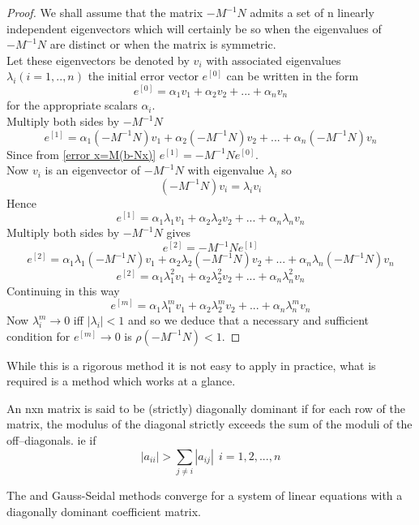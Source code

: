 \begin{proof}
We shall assume that the matrix $-M^{-1}N$ admits a set of n linearly independent
eigenvectors which will certainly be so when the eigenvalues of $-M^{-1}N$ are 
distinct or when the matrix is symmetric.\\
Let these eigenvectors be denoted by $v_i$ with associated eigenvalues $\lambda_i (i=1,..,n)$ the initial error vector $e^{[0]}$ can be written in the form
\[ e^{[0]} = \alpha_1 v_1+\alpha_2v_2+...+\alpha_nv_n\]
for the appropriate scalars $\alpha_i$.\\
Multiply both sides by $-M^{-1}N$
\[ e^{[1]} = \alpha_1 (-M^{-1}N)v_1+\alpha_2(-M^{-1}N)v_2+...+\alpha_n(-M^{-1}N)v_n\]
Since from
\ref{error x=M(b-Nx)} $e^{[1]} = -M^{-1}Ne^{[0]}$.\\
Now $v_i$ is an eigenvector of $-M^{-1}N$ with eigenvalue $\lambda_i$ so
\[
(-M^{-1}N)v_{i}=\lambda_iv_i
\]
Hence
\[ e^{[1]} = \alpha_1 \lambda_1 v_1+\alpha_2\lambda_2v_2+...+\alpha_n\lambda_nv_n\]
Multiply both sides by $-M^{-1}N$ gives
\[e^{[2]} = -M^{-1}Ne^{[1]}\]
\[ e^{[2]} = \alpha_1 \lambda_1(-M^{-1}N) v_1+\alpha_2\lambda_2(-M^{-1}N)v_2+...+\alpha_n\lambda_n(-M^{-1}N)v_n\]
\[ e^{[2]} = \alpha_1 \lambda_1^{2} v_1+\alpha_2\lambda_2^{2}v_2+...+\alpha_n\lambda_n^{2}v_n\]
Continuing in this way
\[ e^{[m]} = \alpha_1 \lambda_1^{m} v_1+\alpha_2\lambda_2^{m}v_2+...+\alpha_n\lambda_n^{m}v_n\]
Now $\lambda_{i}^{m} \rightarrow 0$ iff $|\lambda_i| < 1$ and so we deduce that
a necessary and sufficient condition for $e^{[m]}\rightarrow 0$ is $\rho(-M^{-1}N) < 1$. 
\end{proof}
While this is a rigorous method it is not easy to apply in practice, what is required is a method which works at a glance.
\begin{definition}
An nxn matrix is said to be (strictly) diagonally dominant if for each row of 
the matrix, the modulus of the diagonal strictly exceeds the sum of the moduli of the off--diagonals. ie if
\[
|a_{ii}| >\sum_{j\not=i}|a_{ij}| \ \ i=1,2,...,n 
\]
\end{definition} 
\begin{theorem}
The  and Gauss-Seidal methods converge for a system of linear equations 
with a diagonally dominant coefficient matrix.
\end{theorem}
